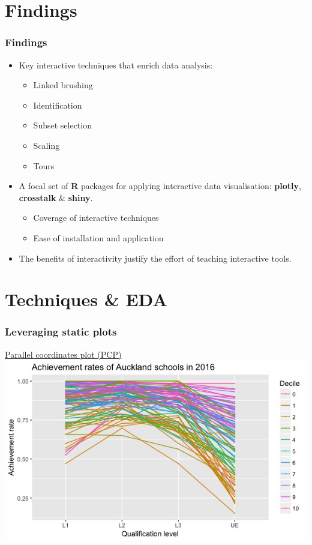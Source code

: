 \documentclass{beamer}
\begin{document}
\section{Findings}
\label{sec:findings}

	\begin{frame}
		\frametitle{Findings}
		\begin{itemize}
			\item Key interactive techniques that enrich data analysis:
			\begin{itemize}
				\item Linked brushing
				\item Identification
				\item Subset selection
				\item Scaling 
				\item Tours
			\end{itemize}
			\item A focal set of \textbf{R} packages for applying interactive data visualisation: \textbf{plotly}, \textbf{crosstalk} \& \textbf{shiny}.
			\begin{itemize}
				\item Coverage of interactive techniques
				\item Ease of installation and application
			\end{itemize}
		\item The benefits of interactivity justify the effort of teaching interactive tools.
		\end{itemize}
	\end{frame}

\section{Techniques \& EDA}
\label{sec:techniques}

	\begin{frame}
		\frametitle{Leveraging static plots}
		\href{https://shanl33.shinyapps.io/presentation_pcp/}{Parallel coordinates plot (PCP)} 
		\href{https://screencast-o-matic.com/watch/cbXlcM2oyE}{\beamergotobutton{Demo}}
		\includegraphics[scale=0.45]{files/pcp.jpeg}
	\end{frame}
\end{document}
